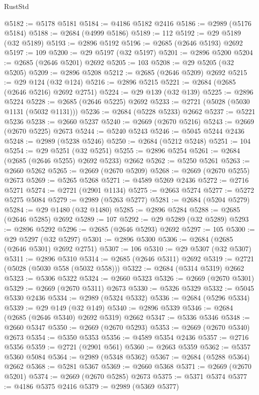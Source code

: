 \begin{lexlean}{RustStd}
\begin{coremodule}
@5182 := @5178 @5181
@5184 := @4186 @5182 @2416
@5186 := @2989 (@5176 @5184)
@5188 := @2684 (@4999 @5186)
@5189 := 112
@5192 := @29 @5189 (@32 @5189)
@5193 := @2896 @5192
@5196 := @2685 (@2646 @5193) @2692
@5197 := 109
@5200 := @29 @5197 (@32 @5197)
@5201 := @2896 @5200
@5204 := @2685 (@2646 @5201) @2692
@5205 := 103
@5208 := @29 @5205 (@32 @5205)
@5209 := @2896 @5208
@5212 := @2685 (@2646 @5209) @2692
@5215 := @29 @124 (@32 @124)
@5216 := @2896 @5215
@5221 := @2684 (@2685 (@2646 @5216) @2692 @2751)
@5224 := @29 @139 (@32 @139)
@5225 := @2896 @5224
@5228 := @2685 (@2646 @5225) @2692
@5233 := @2721 (@5028 (@5030 @1131 (@5032 @1131)))
@5236 := @2684 (@5228 @5233) @2662
@5237 := @5221 @5236
@5238 := @2660 @5237
@5240 := @2669 (@2670 @5216)
@5243 := @2669 (@2670 @5225) @2673
@5244 := @5240 @5243
@5246 := @5045 @5244 @2436
@5248 := @2989 (@5238 @5246)
@5250 := @2684 (@5212 @5248)
@5251 := 104
@5254 := @29 @5251 (@32 @5251)
@5255 := @2896 @5254
@5261 := @2684 (@2685 (@2646 @5255) @2692 @5233) @2662
@5262 := @5250 @5261
@5263 := @2660 @5262
@5265 := @2669 (@2670 @5209)
@5268 := @2669 (@2670 @5255) @2673
@5269 := @5265 @5268
@5271 := @4589 @5269 @2436
@5272 := @2716 @5271
@5274 := @2721 (@2901 @1134)
@5275 := @2663 @5274
@5277 := @5272 @5275 @5084
@5279 := @2989 (@5263 @5277)
@5281 := @2684 (@5204 @5279)
@5284 := @29 @1480 (@32 @1480)
@5285 := @2896 @5284
@5288 := @2685 (@2646 @5285) @2692
@5289 := 107
@5292 := @29 @5289 (@32 @5289)
@5293 := @2896 @5292
@5296 := @2685 (@2646 @5293) @2692
@5297 := 105
@5300 := @29 @5297 (@32 @5297)
@5301 := @2896 @5300
@5306 := @2684 (@2685 (@2646 @5301) @2692 @2751)
@5307 := 106
@5310 := @29 @5307 (@32 @5307)
@5311 := @2896 @5310
@5314 := @2685 (@2646 @5311) @2692
@5319 := @2721 (@5028 (@5030 @558 (@5032 @558)))
@5322 := @2684 (@5314 @5319) @2662
@5323 := @5306 @5322
@5324 := @2660 @5323
@5326 := @2669 (@2670 @5301)
@5329 := @2669 (@2670 @5311) @2673
@5330 := @5326 @5329
@5332 := @5045 @5330 @2436
@5334 := @2989 (@5324 @5332)
@5336 := @2684 (@5296 @5334)
@5339 := @29 @149 (@32 @149)
@5340 := @2896 @5339
@5346 := @2684 (@2685 (@2646 @5340) @2692 @5319) @2662
@5347 := @5336 @5346
@5348 := @2660 @5347
@5350 := @2669 (@2670 @5293)
@5353 := @2669 (@2670 @5340) @2673
@5354 := @5350 @5353
@5356 := @4589 @5354 @2436
@5357 := @2716 @5356
@5359 := @2721 (@2901 @561)
@5360 := @2663 @5359
@5362 := @5357 @5360 @5084
@5364 := @2989 (@5348 @5362)
@5367 := @2684 (@5288 @5364) @2662
@5368 := @5281 @5367
@5369 := @2660 @5368
@5371 := @2669 (@2670 @5201)
@5374 := @2669 (@2670 @5285) @2673
@5375 := @5371 @5374
@5377 := @4186 @5375 @2416
@5379 := @2989 (@5369 @5377)

\end{coremodule}
\end{lexlean}
